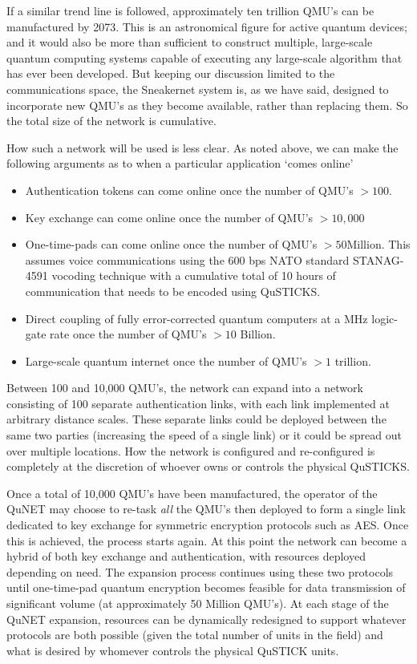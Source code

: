 \documentclass[twocolumn, aps, rmp, amsmath, amssymb, nofootinbib, superscriptaddress, longbibliography, floatfix, table-of-contents, eqsecnum]{revtex4-2}
\begin{document}
If a similar trend line is followed, approximately ten trillion QMU's can be manufactured by 2073. This is an astronomical figure for active quantum devices; and it would also be more than sufficient to construct multiple, large-scale quantum computing systems capable of executing any large-scale algorithm that has ever been developed. But keeping our discussion limited to the communications space, the Sneakernet system is, as we have said, designed to incorporate new QMU's as they become available, rather than replacing them. So the total size of the network is cumulative. 

How such a network will be used is less clear. As noted above, we can make the following arguments as to when a particular application `comes online'
\begin{itemize}
\item Authentication tokens can come online once the number of QMU's $> 100$. 
\item Key exchange can come online once the number of QMU's $> 10,000$
\item One-time-pads can come online once the number of QMU's $> 50$Million. This assumes voice communications using the 600 bps NATO standard STANAG-4591 vocoding technique with a cumulative total of 10 hours of communication that needs to be encoded using QuSTICKS.
\item Direct coupling of fully error-corrected quantum computers at a MHz logic-gate rate once the number of QMU's $> 10$ Billion. 
\item Large-scale quantum internet once the number of QMU's $> 1$ trillion.
\end{itemize}

Between 100 and 10,000 QMU's, the network can expand into a network consisting of 100 separate authentication links, with each link implemented at arbitrary distance scales. These separate links could be deployed between the same two parties (increasing the speed of a single link) or it could be spread out over multiple locations. How the network is configured and re-configured is completely at the discretion of whoever owns or controls the physical QuSTICKS. 

Once a total of 10,000 QMU's have been manufactured, the operator of the QuNET may choose to re-task \textit{all} the QMU's then deployed to form a single link dedicated to key exchange for symmetric encryption protocols such as AES. Once this is achieved, the process starts again. At this point the network can become a hybrid of both key exchange and authentication, with resources deployed depending on need. The expansion process continues using these two protocols until one-time-pad quantum encryption becomes feasible for data transmission of significant volume (at approximately 50 Million QMU's). At each stage of the QuNET expansion, resources can be dynamically redesigned to support whatever protocols are both possible (given the total number of units in the field) and what is desired by whomever controls the physical QuSTICK units. 
\end{document}
